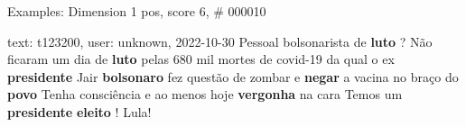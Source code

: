 \begin{frame}{Examples: Dimension 1 pos, score 6, \# 000010}
\footnotesize
\begin{exampleblock}{text: t123200, user: unknown, 2022-10-30}
Pessoal bolsonarista de \textbf{luto} ? Não ficaram um dia de \textbf{luto} 
pelas 680 mil mortes de covid-19 da qual o ex \textbf{presidente} Jair 
\textbf{bolsonaro} fez questão de zombar e \textbf{negar} a vacina no braço do 
\textbf{povo} Tenha consciência e ao menos hoje \textbf{vergonha} na cara Temos 
um \textbf{presidente} \textbf{eleito} ! Lula! 
\end{exampleblock}
\end{frame}
